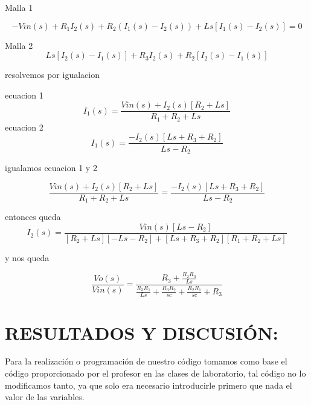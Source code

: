 \documentclass{article}
\begin{document}
Malla 1 

\begin{equation}
-Vin(s)+R_{1}I_{2}(s)+R_{2}(I_{1}(s)-I_{2}(s))+Ls[I_{1}(s)-I_{2}(s)]=0
\end{equation}


Malla 2
\begin{equation}
Ls[I_{2}(s)-I_{1}(s)]+R_{3}I_{2}(s)+R_{2}[I_{2}(s)-I_{1}(s)]
\end{equation}

resolvemos por igualacion

ecuacion 1
\begin{equation}
I_{1}(s)=\frac{Vin(s)+I_{2}(s)[R_{2}+Ls]}{R_{1}+R_{2}+Ls}
\end{equation}
ecuacion 2
\begin{equation}
I_{1}(s)=\frac{-I_{2}(s)[Ls+R_{3}+R_{2}]}{Ls-R_{2}}
\end{equation}


igualamos ecuacion 1 y 2

\begin{equation}
\frac{Vin(s)+I_{2}(s)[R_{2}+Ls]}{R_{1}+R_{2}+Ls}=\frac{-I_{2}(s)[Ls+R_{3}+R_{2}]}{Ls-R_{2}}
\end{equation}

entonces queda
\begin{equation}
I_{2}(s)=\frac{Vin(s)[Ls-R_{2}]}{[R_{2}+Ls][-Ls-R_{2}]+[Ls+R_{3}+R_{2}][R_{1}+R_{2}+Ls]}
\end{equation}

y nos queda

\begin{equation}
\frac{Vo(s)}{Vin(s)}=\frac{R_{3}+\frac{R_{2}R_{3}}{Ls}}
{\frac{R_{3}R_{1}}{Ls}+\frac{R_{3}R_{2}}{sc}+\frac{R_{2}R_{1}}{sc}+R_{3}}
\end{equation}

\section{RESULTADOS Y DISCUSIÓN:}
Para la realización o programación de nuestro código tomamos como base el código proporcionado por el profesor en las clases de laboratorio, tal código no lo modificamos tanto, ya que solo era necesario introducirle primero que nada el valor de las variables. 
\end{document}
